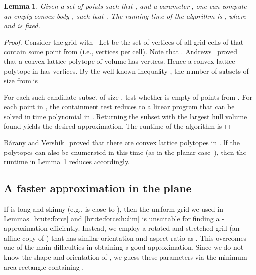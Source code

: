 \documentclass[11pt]{article}
\newtheorem{lemma}{Lemma}
\def\ie{{i.e.}}
\newcommand{\lemlab}[1]{\label{lemma:#1}}
\newcommand{\lemref}[1]{Lemma~\ref{lemma:#1}}
\begin{document}
\begin{lemma}\lemlab{brute:force:h:dim} \label{brute:force:h:dim}
    Given a set  of  points such that
    , and a parameter , one can
    compute an empty convex body , such that
    . The running time of the
    algorithm is ,
    where  and  is fixed.
\end{lemma}
\begin{proof}
    Consider the grid  with .
    Let  be the set of vertices of all grid cells of 
    that contain some point from  (\ie,  vertices per cell).
    Note that .
    Andrews~\cite{And63} proved that a convex lattice polytope of volume
     has  vertices. Hence a convex lattice
    polytope in  has  vertices.
     By the well-known inequality ,
    the number of subsets of size  from  is
    
    For each such candidate subset  of size ,
    test whether  is empty of points from .
    For each point in , the containment test reduces to a linear
    program that can be solved in time polynomial in .
    Returning the subset with the largest hull volume found yields
    the desired approximation. The runtime of the algorithm is
    
\end{proof}

B\'arany and Vershik~\cite{BV92} proved that there are
 convex lattice polytopes in
. If the polytopes can also be enumerated in this time
(as in the planar case~\cite{BP92}), then the runtime
in \lemref{brute:force:h:dim} reduces accordingly.


\subsection{A faster approximation in the plane}
\label{ssec:refine}

If  is long and skinny (e.g.,  is close to ), then
the uniform grid  we used in Lemmas~\ref{brute:force} and
\ref{brute:force:h:dim} is unsuitable for finding
a -approximation efficiently. Instead, we employ a rotated and
stretched grid (an affine copy of ) that has similar
orientation and aspect ratio as . This overcomes one of the
main difficulties in obtaining a good approximation. Since we do not
know the shape and orientation of , we guess these
parameters via the minimum area rectangle containing .
\end{document}
